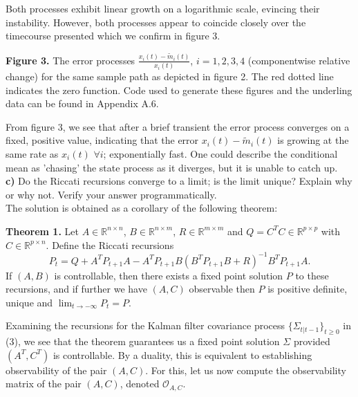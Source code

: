 \documentclass[10pt]{article}
\newcommand{\mbb}[1]{\mathbb{#1}}
\newcommand{\1}[1]{\mathbbm{1}_{#1}}
\newcommand{\mc}[1]{\mathcal{#1}}
\begin{document}
    Both processes exhibit linear growth on a logarithmic scale, evincing their instability. However, both processes appear to coincide closely over the timecourse presented which
    we confirm in figure 3.
    \begin{center}
    \end{center}
    \begin{center}
        \begin{minipage}{\dimexpr\paperwidth-5cm}
            {\bf Figure 3.} The error processes $\tfrac{x_i(t)-\tilde{m}_i(t)}{x_i(t)}$, $i=1,2,3,4$ (componentwise relative change) for the same sample path as depicted in figure 2. The red dotted line indicates the zero function. Code used
            to generate these figures and the underling data can be found in Appendix A.6.
        \end{minipage}
    \end{center}
    From figure 3, we see that after a brief transient the error process converges on a fixed, positive value, indicating that the error $x_i(t)-\tilde{m}_i(t)$ is growing at the same rate as $x_i(t)$ $\forall i$; exponentially fast. One could describe the conditional mean as 'chasing' the state process
    as it diverges, but it is unable to catch up.\\[5pt] 
    {\bf c)} Do the Riccati recursions converge to a limit; is the limit unique? Explain why or why not. Verify your answer programmatically.\\[5pt]
    The solution is obtained as a corollary of the following theorem:
    \begin{center}
        \begin{minipage}{\dimexpr\paperwidth-5cm}
            {\bf Theorem 1.}\hspace{5pt} Let $A\in\mbb{R}^{n\times n}$, $B\in\mbb{R}^{n\times m}$, $R\in\mbb{R}^{m\times m}$ and $Q=C^TC\in\mbb{R}^{p\times p}$ with $C\in\mbb{R}^{p\times n}$. Define the Riccati recursions
            \[P_t=Q+A^TP_{t+1}A-A^TP_{t+1}B(B^TP_{t+1}B+R)^{-1}B^TP_{t+1}A.\]
            If $(A,B)$ is controllable, then there exists a fixed point solution $P$ to these recursions, and if further we have $(A,C)$ observable then $P$ is positive definite, unique and $\lim_{t\rightarrow-\infty}P_t=P$.\\[5pt]
        \end{minipage}
    \end{center}
    Examining the recursions for the Kalman filter covariance process $\{\Sigma_{t|t-1}\}_{t\geq 0}$ in (3), we see that the theorem guarantees us a fixed point solution $\Sigma$ provided $(A^T,C^T)$ is controllable. By a duality, this is equivalent to establishing observability of the pair $(A,C)$. For this, let us now compute the observability matrix of the pair $(A,C)$, denoted $\mc{O}_{A,C}$.
\end{document}
